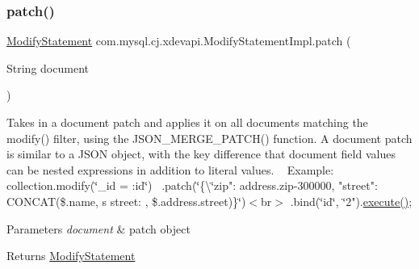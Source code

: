 \mbox{\label{classcom_1_1mysql_1_1cj_1_1xdevapi_1_1_modify_statement_impl_a67bbbca2a519b79e54c1957e4d2f7c92}} 
\subsubsection{\texorpdfstring{patch()}{patch()}\hspace{0.1cm}{\footnotesize\ttfamily [2/2]}}
{\footnotesize\ttfamily \mbox{\hyperlink{interfacecom_1_1mysql_1_1cj_1_1xdevapi_1_1_modify_statement}{Modify\+Statement}} com.\+mysql.\+cj.\+xdevapi.\+Modify\+Statement\+Impl.\+patch (\begin{DoxyParamCaption}\item[{String}]{document }\end{DoxyParamCaption})}

Takes in a document patch and applies it on all documents matching the modify() filter, using the J\+S\+O\+N\+\_\+\+M\+E\+R\+G\+E\+\_\+\+P\+A\+T\+C\+H() function. A document patch is similar to a J\+S\+ON object, with the key difference that document field values can be nested expressions in addition to literal values. ~\newline
 Example\+:~\newline
 collection.\+modify(\char`\"{}\+\_\+id = \+:id\char`\"{})~\newline
 .patch(\char`\"{}\{\textbackslash{}\char`\"{}zip"\+: address.\+zip-\/300000, "street"\+: C\+O\+N\+C\+AT(\$.name, \textquotesingle{}\textquotesingle{}\textquotesingle{}s street\+: \textquotesingle{}, \$.address.\+street)\}\char`\"{})$<$br$>$
.\+bind(\char`\"{}id\char`\"{}, \char`\"{}2").\mbox{\hyperlink{classcom_1_1mysql_1_1cj_1_1xdevapi_1_1_modify_statement_impl_aebce34d0e71257dc9bf3264a6dd0e6cd}{execute()}};


\begin{DoxyParams}{Parameters}
{\em document} & patch object \\
\hline
\end{DoxyParams}
\begin{DoxyReturn}{Returns}
\mbox{\hyperlink{interfacecom_1_1mysql_1_1cj_1_1xdevapi_1_1_modify_statement}{Modify\+Statement}} 
\end{DoxyReturn}


